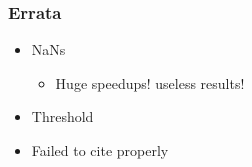 \begin{frame}
    \frametitle{Errata}
    \begin{itemize}
        \item NaNs
        \begin{itemize}
            \item Huge speedups! useless results!
        \end{itemize}
        \item Threshold
        \pause
        \item Failed to cite properly
    \end{itemize}
\end{frame}

